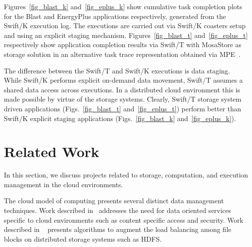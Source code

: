 \documentclass[10pt,journal,cspaper,compsoc]{IEEEtran}
\begin{document}
Figures~\ref{fig_blast_k} and~\ref{fig_eplus_k} show cumulative task completion
plots for the Blast and EnergyPlus applications respectively, generated from
the Swift/K execution log. The executions are carried out via Swift/K coasters
setup and using an explicit staging mechanism. Figures~\ref{fig_blast_t}
and~\ref{fig_eplus_t} respectively show application completion results via
Swift/T with MosaStore as storage solution in an alternative task trace
representation obtained via MPE~\cite{mpe}.

The difference between the Swift/T and Swift/K executions is data staging. While
Swift/K performs explicit on-demand data movement, Swift/T assumes a shared
data access across executions. In a distributed cloud environment this is made
possible by virtue of the storage systems. Clearly, Swift/T storage system
driven applications (Figs.~\ref{fig_blast_t} and~\ref{fig_eplus_t}) perform
better than Swift/K explicit staging applications
(Figs.~\ref{fig_blast_k} and~\ref{fig_eplus_k}).

\section{Related Work} \label{sec:related}
In this section, we discuss projects related to storage, computation, and
execution management in the cloud environments. 
%
%
%
%    
%
%

The cloud model of computing presents several distinct data management
techniques. Work described in~\cite{cloud-dataintensive} addresses the need
for data oriented services specific to cloud environments such as content
specific access and security. Work described in ~\cite{rebalance} presents
algorithms to augment the load balancing among file blocks on distributed
storage systems such as HDFS.
\end{document}
